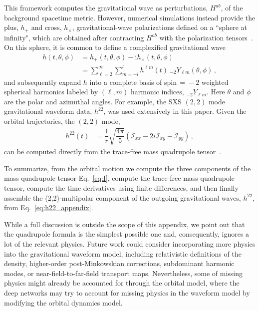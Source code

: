 \documentclass[ reprint,
nofootinbib,
 amsmath,amssymb,
 aps,
]{revtex4-2}
\begin{document}
This framework computes the gravitational wave as perturbations, $H^{ab}$, of the background spacetime metric. However, 
numerical simulations instead provide the plus, $h_+$ and cross, $h_{\times}$, gravitational-wave polarizations
defined on a ``sphere at infinity", which are obtained after
contracting $H^{ab}$ with the polarization tensors~\cite{bishop2016extraction}. 
On this sphere, it is common to define a 
complexified gravitational wave
\begin{align}
h(t, \theta, \phi)  & =  h_+(t, \theta, \phi) - \mathrm{i}  h_{\times}(t, \theta, \phi) \\
& = \sum^{\infty}_{\ell=2} \sum_{m=-l}^{l}
        h^{\ell m}(t) ~_{-2}Y_{\ell m}(\theta, \phi) \,,
\end{align}
and subsequently expand $h$ into a complete
basis of spin$\,=\!\!-2$ weighted spherical harmonics labeled by $(\ell, m)$
harmonic indices, $_{-2}Y_{\ell m}$.
Here $\theta$ and $\phi$ are the polar and azimuthal angles.
For example, the SXS $(2,2)$ mode gravitational waveform data, $h^{22}$, was used extensively in this paper.
Given the orbital trajectories, the $(2,2)$ mode,
\begin{align}
\label{eq:h22_appendix}
h^{22}(t) &=\dfrac{1}{r}\sqrt{\dfrac{4\pi}{5}}\left(\ddot{\mathcal{I}}_{xx}
- 2 i\ddot{\mathcal{I}}_{xy}-\ddot{\mathcal{I}}_{yy}\right)\,,
\end{align}
can be computed directly from the trace-free mass quadrupole tensor~\cite[Eqs.~54--56]{bishop2016extraction}.

To summarize, from the orbital motion we compute the three components of the
mass quadrupole tensor Eq.~\eqref{eq:I}, compute the trace-free mass quadrupole tensor, compute the time derivatives using finite differences, and then finally assemble the (2,2)-multipolar component of the outgoing gravitational waves, $h^{22}$, from Eq.~\eqref{eq:h22_appendix}.



While a full discussion is outside the
scope of this appendix, we point out that the quadrupole formula is the simplest possible one
and, consequently, ignores a lot of the relevant physics. Future work could consider incorporating more physics into the gravitational waveform model, including
relativistic definitions of the density, higher-order post-Minkowskian corrections, subdominant
harmonic modes, or
near-field-to-far-field transport maps.
Nevertheless, some of missing physics might already be accounted for through the orbital 
model, where the deep networks may try to account for  missing physics in the waveform model by modifying
the orbital dynamics model.







\end{document}
